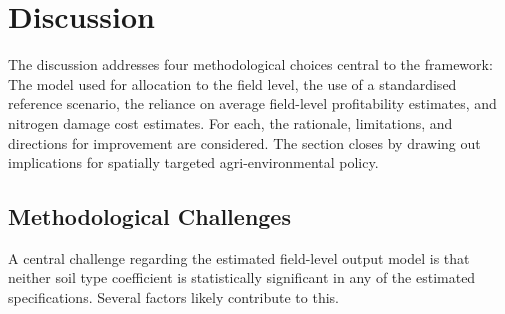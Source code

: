 \documentclass[12pt]{article}
\begin{document}



\section{Discussion}
\label{sec:discussion}
The discussion addresses four methodological choices central to the framework: The model used for allocation to the field level, the use of a standardised reference scenario, the reliance on average field-level profitability estimates, and nitrogen damage cost estimates. 
For each, the rationale, limitations, and directions for improvement are considered. 
The section closes by drawing out implications for spatially targeted agri-environmental policy.

\subsection{Methodological Challenges}
\label{sec:discussion-method-challenges}
A central challenge regarding the estimated field-level output model is that neither soil type coefficient is statistically significant in any of the estimated specifications.
Several factors likely contribute to this.
\end{document}
